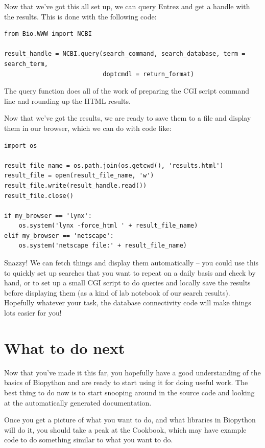 \documentclass{report}
\begin{document}
Now that we've got this all set up, we can query Entrez and get a handle with the results. This is done with the following code:

\begin{verbatim}
from Bio.WWW import NCBI

result_handle = NCBI.query(search_command, search_database, term = search_term,
                           doptcmdl = return_format)
\end{verbatim}

The query function does all of the work of preparing the CGI script command line and rounding up the HTML results.


Now that we've got the results, we are ready to save them to a file and display them in our browser, which we can do with code like:

\begin{verbatim}
import os

result_file_name = os.path.join(os.getcwd(), 'results.html')
result_file = open(result_file_name, 'w')
result_file.write(result_handle.read())
result_file.close()

if my_browser == 'lynx':
    os.system('lynx -force_html ' + result_file_name)
elif my_browser == 'netscape':
    os.system('netscape file:' + result_file_name)
\end{verbatim}

Snazzy! We can fetch things and display them automatically -- you could use this to quickly set up searches that you want to repeat on a daily basis and check by hand, or to set up a small CGI script to do queries and locally save the results before displaying them (as a kind of lab notebook of our search results). Hopefully whatever your task, the database connectivity code will make things lots easier for you!

\section{What to do next}

Now that you've made it this far, you hopefully have a good understanding of the basics of Biopython and are ready to start using it for doing useful work. The best thing to do now is to start snooping around in the source code and looking at the automatically generated documentation. 


Once you get a picture of what you want to do, and what libraries in Biopython will do it, you should take a peak at the Cookbook, which may have example code to do something similar to what you want to do. 
\end{document}
